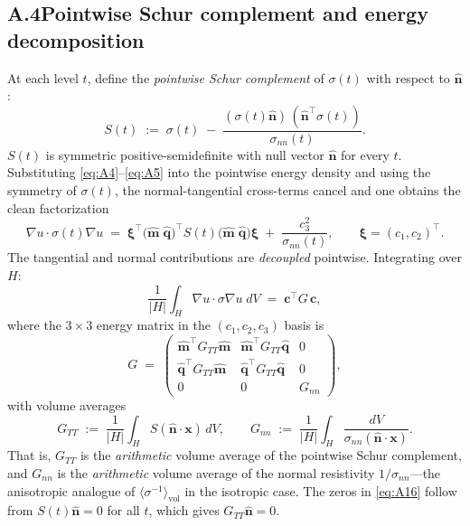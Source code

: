 \documentclass[11pt]{article}
\newcommand{\nn}{\hat{\bm{n}}}
\newcommand{\mm}{\hat{\bm{m}}}
\newcommand{\qq}{\hat{\bm{q}}}
\newcommand{\invs}{\langle\sigma^{-1}\rangle_{\mathrm{vol}}}
\newcommand{\GTT}{G_{TT}}
\newcommand{\Gnn}{G_{nn}}
\begin{document}
\subsection*{A.4\quad Pointwise Schur complement and energy decomposition}

At each level $t$, define the \emph{pointwise Schur complement} of $\sigma(t)$
with respect to $\nn$:
\begin{equation}\label{eq:A12}
  S(t) \;:=\; \sigma(t)
  \;-\; \frac{(\sigma(t)\nn)\,(\nn^\top\!\sigma(t))}{\sigma_{nn}(t)}.
\end{equation}
$S(t)$ is symmetric positive-semidefinite with null vector $\nn$ for every $t$.
Substituting \eqref{eq:A4}--\eqref{eq:A5} into the pointwise energy density
and using the symmetry of $\sigma(t)$, the normal-tangential cross-terms
cancel and one obtains the clean factorization
\begin{equation}\label{eq:A13}
  \nabla u\cdot\sigma(t)\nabla u
  \;=\; \bm{\xi}^\top\!\bigl(\mm\;\qq\bigr)^\top\!S(t)\bigl(\mm\;\qq\bigr)\bm{\xi}
  \;+\; \frac{c_3^2}{\sigma_{nn}(t)},
  \qquad \bm{\xi} = (c_1,c_2)^\top.
\end{equation}
The tangential and normal contributions are \emph{decoupled} pointwise.
Integrating over $H$:
\begin{equation}\label{eq:A15}
  \frac{1}{|H|}\int_H \nabla u\cdot\sigma\nabla u\;dV
  \;=\; \bm{c}^\top G\,\bm{c},
\end{equation}
where the $3\times 3$ energy matrix in the $(c_1,c_2,c_3)$ basis is
\begin{equation}\label{eq:A16}
  G \;=\;
  \begin{pmatrix}
    \mm^\top\!\GTT\mm & \mm^\top\!\GTT\qq & 0 \\[2pt]
    \qq^\top\!\GTT\mm & \qq^\top\!\GTT\qq & 0 \\[2pt]
    0 & 0 & \Gnn
  \end{pmatrix},
\end{equation}
with volume averages
\begin{equation}\label{eq:GTT_Gnn}
  \GTT \;:=\; \frac{1}{|H|}\int_H S(\nn\cdot\bm{x})\,dV,
  \qquad
  \Gnn \;:=\; \frac{1}{|H|}\int_H \frac{dV}{\sigma_{nn}(\nn\cdot\bm{x})}.
\end{equation}
That is, $\GTT$ is the \emph{arithmetic} volume average of the pointwise
Schur complement, and $\Gnn$ is the \emph{arithmetic} volume average of the
normal resistivity $1/\sigma_{nn}$---the anisotropic analogue of $\invs$ in the
isotropic case.
The zeros in \eqref{eq:A16} follow from $S(t)\nn = 0$ for all $t$, which gives
$\GTT\nn = 0$.
\end{document}
